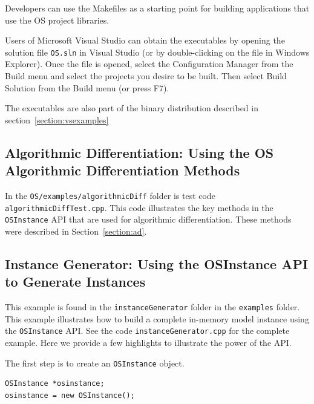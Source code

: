 \documentclass[11pt]{article}
\renewcommand{\_}{{\char"5F}}
\renewcommand{\{}{{\char"7B}}
\renewcommand{\}}{{\char"7D}}
\renewcommand{\^}{{\char"0D}}
\renewcommand{\'}{{\char"0D}}
\begin{document}
\begin{enumerate}[Step 1:]
Developers can use the Makefiles as a starting point for building applications that use the OS project libraries.

\medskip
Users of Microsoft Visual Studio can obtain the executables by opening the solution file 
{\tt OS.sln} in
Visual Studio (or by double-clicking on the file in Windows Explorer). Once the file is opened, select the
Configuration Manager from the Build menu and select the projects you desire to be built. Then select
Build Solution from the Build menu (or press F7). 

The executables are also part of the binary distribution described in section~\ref{section:vsexamples}


\subsection{Algorithmic Differentiation:  Using the OS Algorithmic Differentiation Methods}\label{section:cppad}

In the {\tt OS/examples/algorithmicDiff} folder is test code {\tt algorithmicDiffTest.cpp}. This code
illustrates the key methods in the {\tt OSInstance} API that are used for
algorithmic differentiation.   These methods were described in Section~\ref{section:ad}.



\subsection{Instance Generator: Using the OSInstance API to Generate Instances}\label{section:exampleOSInstanceGeneration}

This example is found in the {\tt instanceGenerator} folder in the {\tt examples} folder. This example illustrates
how to build a complete in-memory model instance using the {\tt OSInstance} API.
See the code {\tt instanceGenerator.cpp} for the complete example. Here we provide a few highlights to illustrate
the power of the API.

The first step is to create an {\tt OSInstance} object.
\begin{verbatim}
OSInstance *osinstance;
osinstance = new OSInstance();
\end{verbatim}


\end{enumerate}
\end{document}
